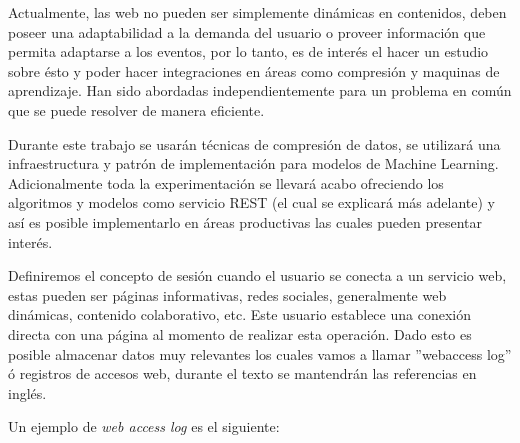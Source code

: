   Actualmente, las web no pueden ser simplemente dinámicas en contenidos, deben poseer una adaptabilidad a la demanda del usuario o proveer información que permita adaptarse a los eventos, por lo tanto, es de interés el hacer un estudio sobre ésto y poder hacer integraciones en áreas como compresión y maquinas de aprendizaje. Han sido abordadas independientemente para un problema en común que se puede resolver de manera eficiente. 

  Durante este trabajo se usarán técnicas de compresión de datos, se utilizará una infraestructura y patrón de implementación para modelos de Machine Learning. Adicionalmente toda la experimentación se llevará acabo ofreciendo los algoritmos y modelos como servicio REST (el cual se explicará más adelante) y así es posible implementarlo en áreas productivas las cuales pueden presentar interés.


  Definiremos el concepto de sesión cuando el usuario se conecta a un servicio web, estas pueden ser páginas informativas, redes sociales, generalmente web dinámicas, contenido colaborativo, etc. Este usuario establece una conexión directa con una página al momento de realizar esta operación. Dado esto es posible almacenar datos muy relevantes los cuales vamos a llamar ''webaccess log'' ó registros de accesos web, durante el texto se mantendrán las referencias en inglés.

  Un ejemplo de \emph{web access log} es el siguiente:



